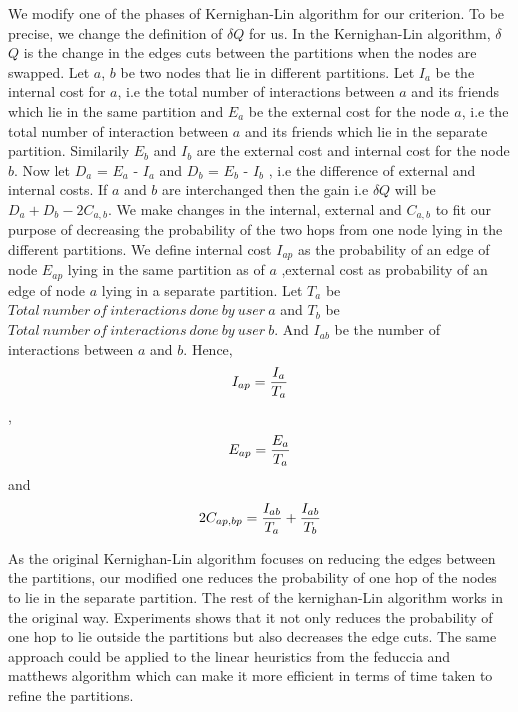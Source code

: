 \documentclass[letterpaper]{article}
\begin{document}
    We modify one of the phases of  Kernighan-Lin algorithm for our criterion.
To be precise, we change the definition of $\delta$$Q$ for us. In the
Kernighan-Lin algorithm, $\delta$$Q$ is the change in the edges cuts between
the partitions when the nodes are swapped. Let $a$, $b$ be two nodes that lie
in different partitions. Let $I_a$ be the internal cost for $a$, i.e the total
number of interactions between $a$ and its friends which lie in the same
partition and  $E_a$ be the external cost for the node $a$, i.e the total
number of interaction between $a$ and its friends which lie in the separate
partition. Similarily $E_b$ and $I_b$ are the external cost and internal cost
for the node $b$. Now let $D_a$ = $E_a$ - $I_a$ and $D_b$ = $E_b$
- $I_b$ , i.e the difference of external and internal costs. If $a$ and $b$ are
  interchanged then the gain i.e $\delta$$Q$ will be $D_a + D_b -2C_{a,b}$. We
make changes in the internal, external and $C_{a,b}$ to fit our purpose of
decreasing the probability of the two hops from one node lying in the different
partitions. We define internal cost $I_{ap}$ as the probability of an edge of
node $E_{ap}$ lying in the same partition as of $a$ ,external cost as
probability of an edge of node $a$ lying in a separate partition. Let $T_a$ be
$Total\ number\ of\ interactions\ done\ by\ user\ a$ and $T_b$ be $Total\
number\ of\ interactions\ done\ by\ user\ b$. And $I_{ab}$ be the number of
interactions between $a$ and $b$. Hence,\\
\begin{displaymath}I_{ap}=\frac{I_a}{T_a}\\\end{displaymath},
\\\begin{displaymath}E_{ap}=\frac{E_a}{T_a}\\\end{displaymath} and\\
\begin{displaymath}2C_{ap,bp}=\frac{I_{ab}}{T_a}+\frac{I_{ab}}{T_b}\\\end{displaymath}


    As the original Kernighan-Lin algorithm focuses on reducing the edges
between the partitions, our modified one reduces the probability of one hop of
the nodes to lie in the separate partition.  The rest of the kernighan-Lin
algorithm works in the original way. Experiments shows that it not only reduces
the probability of one hop to lie outside the partitions but also decreases the
edge cuts. The same approach could be applied to the linear heuristics from the
feduccia and matthews algorithm\cite{23} which can make it more efficient in
terms of time taken to refine the partitions.
 
\end{document}
